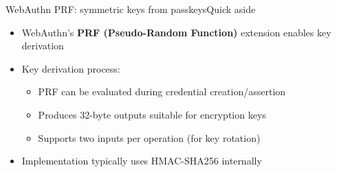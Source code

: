 \documentclass[aspectratio=169, lualatex, handout]{beamer}
\begin{document}
\begin{frame}{WebAuthn PRF: symmetric keys from passkeys}{Quick aside}
	\begin{itemize}
		\item WebAuthn's \textbf{PRF (Pseudo-Random Function)} extension enables key derivation
		\item Key derivation process:
		      \begin{itemize}
			      \item PRF can be evaluated during credential creation/assertion
			      \item Produces 32-byte outputs suitable for encryption keys
			      \item Supports two inputs per operation (for key rotation)
		      \end{itemize}
		\item Implementation typically uses HMAC-SHA256 internally
	\end{itemize}
\end{frame}
\end{document}
